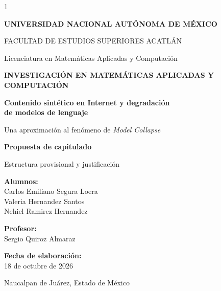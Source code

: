 \documentclass[12pt,letterpaper]{article}
\newcommand{\fechaactividad}{18 de octubre de 2026}
\begin{document}
\begin{titlepage}
\thispagestyle{empty}
\begin{spacing}{1}
\begin{center}
\vspace*{0.5cm}
{\large\bfseries UNIVERSIDAD NACIONAL AUTÓNOMA DE MÉXICO\par}
\vspace{0.25cm}
{\large FACULTAD DE ESTUDIOS SUPERIORES ACATLÁN\par}
\vspace{0.15cm}
{\normalsize Licenciatura en Matemáticas Aplicadas y Computación\par}
\vspace{1.15cm}
{\large\bfseries INVESTIGACIÓN EN MATEMÁTICAS APLICADAS Y\\COMPUTACIÓN\par}
\vspace{1.1cm}
{\LARGE\bfseries Contenido sintético en Internet y degradación\\[0.15cm]de modelos de lenguaje\par}
\vspace{0.35cm}
{\large Una aproximación al fenómeno de \textit{Model Collapse}\par}
\vspace{0.7cm}
{\Large\bfseries Propuesta de capitulado\par}
\vspace{0.2cm}
{\normalsize Estructura provisional y justificación\par}
\end{center}
\vspace{1.4cm}
\begin{flushright}
\begin{minipage}{0.64\textwidth}
\textbf{Alumnos:}\\[0.15cm]
Carlos Emiliano Segura Loera\\
Valeria Hernandez Santos\\
Nehiel Ramirez Hernandez
\vspace{0.5cm}

\textbf{Profesor:}\\[0.1cm]
Sergio Quiroz Almaraz
\vspace{0.5cm}

\textbf{Fecha de elaboración:}\\[0.1cm]
\fechaactividad
\vspace{0.5cm}

Naucalpan de Juárez, Estado de México
\end{minipage}
\end{flushright}
\end{spacing}
\end{titlepage}
\justifying
\end{document}
